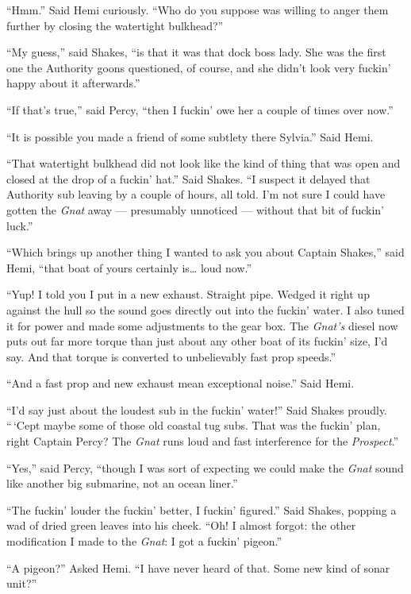 \documentclass[
]{scrbook}
\begin{document}
``Hmm.'' Said Hemi curiously. ``Who do you suppose was willing to anger
them further by closing the watertight bulkhead?''

``My guess,'' said Shakes, ``is that it was that dock boss lady. She was
the first one the Authority goons questioned, of course, and she didn't
look very fuckin' happy about it afterwards.''

``If that's true,'' said Percy, ``then I fuckin' owe her a couple of
times over now.''

``It is possible you made a friend of some subtlety there Sylvia.'' Said
Hemi.

``That watertight bulkhead did not look like the kind of thing that was
open and closed at the drop of a fuckin' hat.'' Said Shakes. ``I suspect
it delayed that Authority sub leaving by a couple of hours, all told.
I'm not sure I could have gotten the \emph{Gnat} away --- presumably
unnoticed --- without that bit of fuckin' luck.''

``Which brings up another thing I wanted to ask you about Captain
Shakes,'' said Hemi, ``that boat of yours certainly is\ldots{} loud
now.''

``Yup! I told you I put in a new exhaust. Straight pipe. Wedged it right
up against the hull so the sound goes directly out into the fuckin'
water. I also tuned it for power and made some adjustments to the gear
box. The \emph{Gnat's} diesel now puts out far more torque than just
about any other boat of its fuckin' size, I'd say. And that torque is
converted to unbelievably fast prop speeds.''

``And a fast prop and new exhaust mean exceptional noise.'' Said Hemi.

``I'd say just about the loudest sub in the fuckin' water!'' Said Shakes
proudly. ``\,`Cept maybe some of those old coastal tug subs. That was
the fuckin' plan, right Captain Percy? The \emph{Gnat} runs loud and
fast interference for the \emph{Prospect}.''

``Yes,'' said Percy, ``though I was sort of expecting we could make the
\emph{Gnat} sound like another big submarine, not an ocean liner.''

``The fuckin' louder the fuckin' better, I fuckin' figured.'' Said
Shakes, popping a wad of dried green leaves into his cheek. ``Oh! I
almost forgot: the other modification I made to the \emph{Gnat}: I got a
fuckin' pigeon.''

``A pigeon?'' Asked Hemi. ``I have never heard of that. Some new kind of
sonar unit?''
\end{document}
